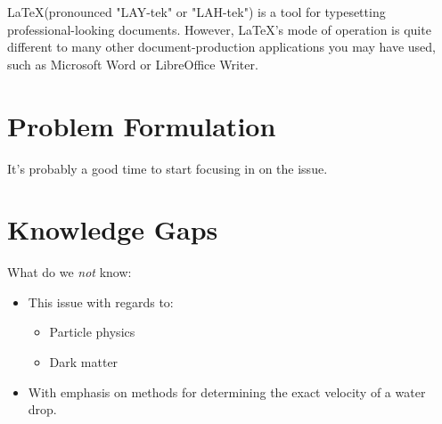 \noindent \LaTeX (pronounced "LAY-tek" or "LAH-tek") is a tool for typesetting professional-looking documents. However, LaTeX's mode of operation is quite different to many other document-production applications you may have used, such as Microsoft Word or LibreOffice Writer.\\

\section{Problem Formulation}\label{sec:problem}
\noindent It's probably a good time to start focusing in on the issue.\\

\section{Knowledge Gaps}\label{sec:gaps}
\noindent What do we \emph{not} know:
\begin{itemize}
	\item This issue with regards to:
	\begin{itemize}
		\item Particle physics
		\item Dark matter
	\end{itemize}
	\item With emphasis on methods for determining the exact velocity of a water drop.
\end{itemize}